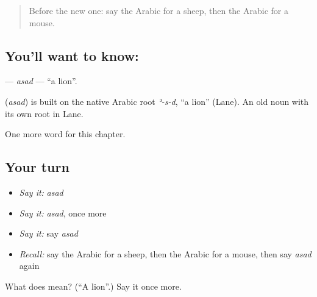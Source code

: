 \label{lesson:AR-C79-asad}



\begin{quote}
Before the new one: say the Arabic for a sheep, then the Arabic for a mouse.
\end{quote}

\subsection*{You'll want to know: }
\textbf{} — \emph{asad} — \textquotedblleft{}a lion\textquotedblright{}.

\begin{cousinweb}
\textbf{} (\emph{asad}) is built on the native Arabic root \emph{ʾ-s-d}, \textquotedblleft{}a lion\textquotedblright{} (Lane). An old noun with its own root in Lane.
\end{cousinweb}

\begin{grammarlens}[title={What you've built}]
One more word for this chapter.
\end{grammarlens}

\subsection*{Your turn}
\begin{itemize}
\raggedright
  \item \emph{Say it:} \emph{asad}
  \item \emph{Say it:} \emph{asad}, once more
  \item \emph{Say it:} say \emph{asad}
  \item \emph{Recall:} say the Arabic for a sheep, then the Arabic for a mouse, then say \emph{asad} again
\end{itemize}

\begin{tcolorbox}[breakable,colback=teal!4,colframe=teal!35!black,title={Before you move on}]
What does  mean? (\textquotedblleft{}A lion\textquotedblright{}.) Say it once more.
\end{tcolorbox}
